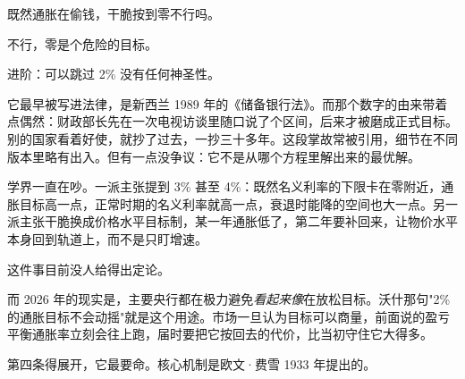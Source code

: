 既然通胀在偷钱，干脆按到零不行吗。

不行，零是个危险的目标。

\begin{flowlist}
\end{flowlist}

\begin{deepbox}{进阶：可以跳过}
2\% 没有任何神圣性。

它最早被写进法律，是新西兰 1989 年的《储备银行法》。而那个数字的由来带着点偶然：财政部长先在一次电视访谈里随口说了个区间，后来才被磨成正式目标。别的国家看着好使，就抄了过去，一抄三十多年。这段掌故常被引用，细节在不同版本里略有出入。但有一点没争议：它不是从哪个方程里解出来的最优解。

学界一直在吵。一派主张提到 3\% 甚至 4\%：既然名义利率的下限卡在零附近，通胀目标高一点，正常时期的名义利率就高一点，衰退时能降的空间也大一点。另一派主张干脆换成价格水平目标制，某一年通胀低了，第二年要补回来，让物价水平本身回到轨道上，而不是只盯增速。

这件事目前没人给得出定论。

而 2026 年的现实是，主要央行都在极力避免\emph{看起来像}在放松目标。沃什那句"2\% 的通胀目标不会动摇"就是这个用途。市场一旦认为目标可以商量，前面说的盈亏平衡通胀率立刻会往上跑，届时要把它按回去的代价，比当初守住它大得多。

\end{deepbox}

第四条得展开，它最要命。核心机制是欧文·费雪 1933 年提出的。

\begin{chainflow}
\chainarrow {}\chainarrow {}\chainarrow {}\chainarrow {}\chainarrow {}
\end{chainflow}

